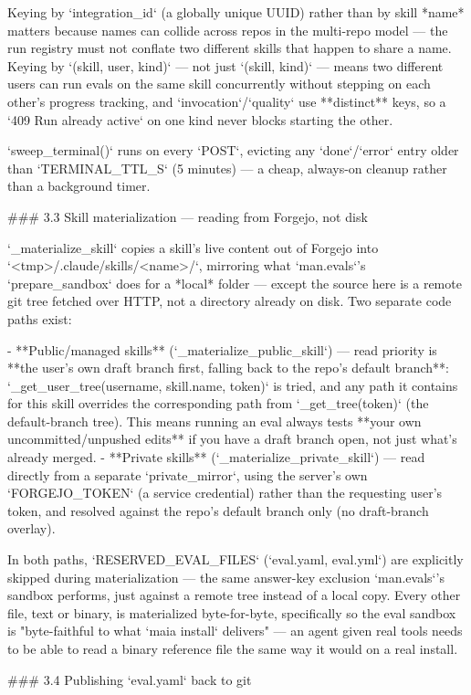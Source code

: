 Keying by `integration_id` (a globally unique UUID) rather than by skill *name* matters because names can collide across repos in the multi-repo model — the run registry must not conflate two different skills that happen to share a name. Keying by `(skill, user, kind)` — not just `(skill, kind)` — means two different users can run evals on the same skill concurrently without stepping on each other's progress tracking, and `invocation`/`quality` use **distinct** keys, so a `409 Run already active` on one kind never blocks starting the other.

`sweep_terminal()` runs on every `POST`, evicting any `done`/`error` entry older than `TERMINAL_TTL_S` (5 minutes) — a cheap, always-on cleanup rather than a background timer.

### 3.3 Skill materialization — reading from Forgejo, not disk

`_materialize_skill` copies a skill's live content out of Forgejo into `<tmp>/.claude/skills/<name>/`, mirroring what `man.evals`'s `prepare_sandbox` does for a *local* folder — except the source here is a remote git tree fetched over HTTP, not a directory already on disk. Two separate code paths exist:

- **Public/managed skills** (`_materialize_public_skill`) — read priority is **the user's own draft branch first, falling back to the repo's default branch**: `_get_user_tree(username, skill.name, token)` is tried, and any path it contains for this skill overrides the corresponding path from `_get_tree(token)` (the default-branch tree). This means running an eval always tests **your own uncommitted/unpushed edits** if you have a draft branch open, not just what's already merged.
- **Private skills** (`_materialize_private_skill`) — read directly from a separate `private_mirror`, using the server's own `FORGEJO_TOKEN` (a service credential) rather than the requesting user's token, and resolved against the repo's default branch only (no draft-branch overlay).

In both paths, `RESERVED_EVAL_FILES` (`{eval.yaml, eval.yml}`) are explicitly skipped during materialization — the same answer-key exclusion `man.evals`'s sandbox performs, just against a remote tree instead of a local copy. Every other file, text or binary, is materialized byte-for-byte, specifically so the eval sandbox is "byte-faithful to what `maia install` delivers" — an agent given real tools needs to be able to read a binary reference file the same way it would on a real install.

### 3.4 Publishing `eval.yaml` back to git

